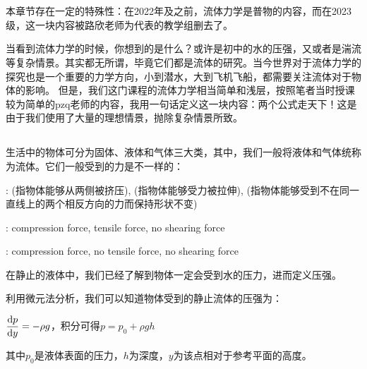 \begin{comment}
    \documentclass{Physics_H_Notes}
    \usepackage{upgreek}

\end{comment}
\chapter[流体力学]{}
本章节存在一定的特殊性：在2022年及之前，流体力学是普物的内容，而在2023级，这一块内容被路欣老师为代表的教学组删去了。

当看到流体力学的时候，你想到的是什么？或许是初中的水的压强，又或者是湍流等复杂情景。其实都无所谓，毕竟它们都是流体的研究。当今世界对于流体力学的探究也是一个重要的力学方向，小到潜水，大到飞机飞船，都需要关注流体对于物体的影响。
但是，我们这门课程的流体力学相当简单和浅层，按照笔者当时授课较为简单的pzq老师的内容，我用一句话定义这一块内容：两个公式走天下！这是由于我们使用了大量的理想情景，抛除复杂情景所致。
\section[流体的定义与性质]{}
生活中的物体可分为固体、液体和气体三大类，其中，我们一般将液体和气体统称为流体。它们一般受到的力是不一样的：
\begin{Itemize}
    \item {}: (指物体能够从两侧被挤压), (指物体能够受力被拉伸),
    (指物体能够受到不在同一直线上的两个相反方向的力而保持形状不变)
    \item {}: compression force, tensile force, no shearing force
    \item {}: compression force, no tensile force, no shearing force
\end{Itemize}

在静止的液体中，我们已经了解到物体一定会受到水的压力，进而定义压强。
\begin{law}[静止流体中的压强]
    利用微元法分析，我们可以知道物体受到的静止流体的压强为：
    \begin{center}
        $\dfrac{\dif p}{\dif y}=-\rho g$，积分可得$p=p_0+\rho gh$
    \end{center}

    其中$p_0$是液体表面的压力，$h$为深度，$y$为该点相对于参考平面的高度。
\end{law}

